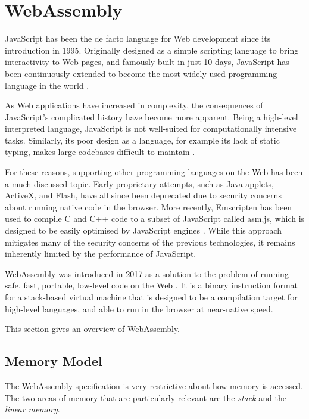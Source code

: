 \section{WebAssembly}

JavaScript has been the de facto language for Web development since its introduction in 1995. Originally designed as a simple scripting language to bring interactivity to Web pages, and famously built in just 10 days, JavaScript has been continuously extended to become the most widely used programming language in the world \cite{wirfs-brockJavaScriptfirst202020a}.

As Web applications have increased in complexity, the consequences of JavaScript's complicated history have become more apparent. Being a high-level interpreted language, JavaScript is not well-suited for computationally intensive tasks. Similarly, its poor design as a language, for example its lack of static typing, makes large codebases difficult to maintain \cite{ocarizajr.JavaScriptErrorsWild2011, biermanUnderstandingTypeScript2014}.

For these reasons, supporting other programming languages on the Web has been a much discussed topic. Early proprietary attempts, such as Java applets, ActiveX, and Flash, have all since been deprecated due to security concerns about running native code in the browser. More recently, Emscripten has been used to compile C and C++ code to a subset of JavaScript called asm.js, which is designed to be easily optimised by JavaScript engines \cite{zakaiEmscriptenLLVMtoJavaScriptcompiler2011}. While this approach mitigates many of the security concerns of the previous technologies, it remains inherently limited by the performance of JavaScript.

WebAssembly was introduced in 2017 as a solution to the problem of running safe, fast, portable, low-level code on the Web \cite{haasBringingwebspeed2017}. It is a binary instruction format for a stack-based virtual machine that is designed to be a compilation target for high-level languages, and able to run in the browser at near-native speed.

This section gives an overview of WebAssembly.

\subsection{Memory Model}

The WebAssembly specification \cite{webassemblycommunitygroupWebAssemblySpecification202025} is very restrictive about how memory is accessed. The two areas of memory that are particularly relevant are the \emph{stack} and the \emph{linear memory}.

